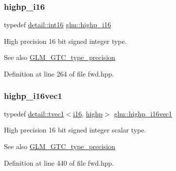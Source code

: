 \subsubsection{\texorpdfstring{highp\+\_\+i16}{highp\_i16}}
{\footnotesize\ttfamily typedef \hyperlink{namespaceglm_1_1detail_a375938874ca4f0a0982ec6373b56117b}{detail\+::int16} \hyperlink{group__gtc__type__precision_gaa04399853952dbce29cb62e2432f350a}{glm\+::highp\+\_\+i16}}

High precision 16 bit signed integer type. \begin{DoxySeeAlso}{See also}
\hyperlink{group__gtc__type__precision}{G\+L\+M\+\_\+\+G\+T\+C\+\_\+type\+\_\+precision} 
\end{DoxySeeAlso}


Definition at line 264 of file fwd.\+hpp.

\mbox{\label{group__gtc__type__precision_ga0ed3103e2d3acb4efbe313add4243a72}} 
\subsubsection{\texorpdfstring{highp\+\_\+i16vec1}{highp\_i16vec1}}
{\footnotesize\ttfamily typedef \hyperlink{structglm_1_1detail_1_1tvec1}{detail\+::tvec1}$<$\hyperlink{group__gtc__type__precision_ga35e5542ca05b29cc256fdafb8503d1fd}{i16}, \hyperlink{namespaceglm_a0f04f086094c747d227af4425893f545ac6f7eab42eacbb10d59a58e95e362074}{highp}$>$ \hyperlink{group__gtc__type__precision_ga0ed3103e2d3acb4efbe313add4243a72}{glm\+::highp\+\_\+i16vec1}}

High precision 16 bit signed integer scalar type. \begin{DoxySeeAlso}{See also}
\hyperlink{group__gtc__type__precision}{G\+L\+M\+\_\+\+G\+T\+C\+\_\+type\+\_\+precision} 
\end{DoxySeeAlso}


Definition at line 440 of file fwd.\+hpp.

\mbox{\label{group__gtc__type__precision_ga74df9e215c049f82d277473c4c974bb4}} 
